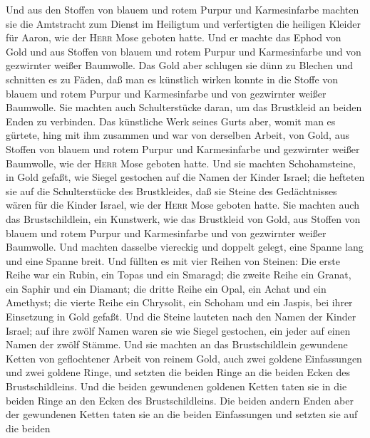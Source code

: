  Und aus den Stoffen von blauem und rotem Purpur und
Karmesinfarbe machten sie die Amtstracht zum Dienst im Heiligtum und
verfertigten die heiligen Kleider für Aaron, wie der \textsc{Herr} Mose
geboten hatte.  Und er machte das Ephod von Gold und aus
Stoffen von blauem und rotem Purpur und Karmesinfarbe und von gezwirnter
weißer Baumwolle.  Das Gold aber schlugen sie dünn zu
Blechen und schnitten es zu Fäden, daß man es künstlich wirken konnte in
die Stoffe von blauem und rotem Purpur und Karmesinfarbe und von
gezwirnter weißer Baumwolle.  Sie machten auch
Schulterstücke daran, um das Brustkleid an beiden Enden zu verbinden.
 Das künstliche Werk seines Gurts aber, womit man es
gürtete, hing mit ihm zusammen und war von derselben Arbeit, von Gold,
aus Stoffen von blauem und rotem Purpur und Karmesinfarbe und gezwirnter
weißer Baumwolle, wie der \textsc{Herr} Mose geboten hatte.
 Und sie machten Schohamsteine, in Gold gefaßt, wie Siegel
gestochen auf die Namen der Kinder Israel;  die hefteten
sie auf die Schulterstücke des Brustkleides, daß sie Steine des
Gedächtnisses wären für die Kinder Israel, wie der \textsc{Herr} Mose
geboten hatte.  Sie machten auch das Brustschildlein, ein
Kunstwerk, wie das Brustkleid von Gold, aus Stoffen von blauem und rotem
Purpur und Karmesinfarbe und von gezwirnter weißer Baumwolle.
 Und machten dasselbe viereckig und doppelt gelegt, eine
Spanne lang und eine Spanne breit.  Und füllten es mit
vier Reihen von Steinen: Die erste Reihe war ein Rubin, ein Topas und
ein Smaragd;  die zweite Reihe ein Granat, ein Saphir und
ein Diamant;  die dritte Reihe ein Opal, ein Achat und
ein Amethyst;  die vierte Reihe ein Chrysolit, ein
Schoham und ein Jaspis, bei ihrer Einsetzung in Gold gefaßt.
 Und die Steine lauteten nach den Namen der Kinder
Israel; auf ihre zwölf Namen waren sie wie Siegel gestochen, ein jeder
auf einen Namen der zwölf Stämme.  Und sie machten an das
Brustschildlein gewundene Ketten von geflochtener Arbeit von reinem
Gold,  auch zwei goldene Einfassungen und zwei goldene
Ringe, und setzten die beiden Ringe an die beiden Ecken des
Brustschildleins.  Und die beiden gewundenen goldenen
Ketten taten sie in die beiden Ringe an den Ecken des Brustschildleins.
 Die beiden andern Enden aber der gewundenen Ketten taten
sie an die beiden Einfassungen und setzten sie auf die beiden
